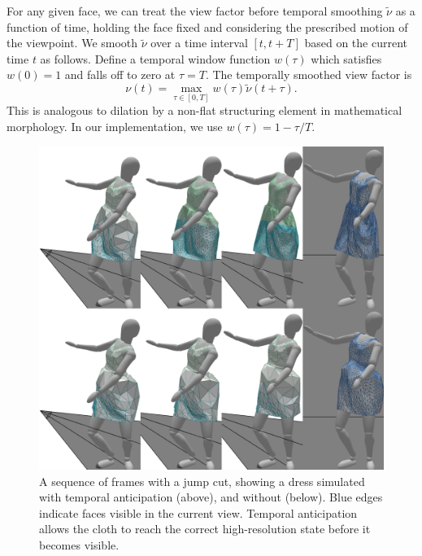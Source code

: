 \documentclass[10pt,journal,compsoc,twoside]{TexInputs/IEEEtran}
\begin{document}
For any given face, we can treat the view factor before temporal smoothing $\tilde\nu$ as a function of time, holding the face fixed and considering the prescribed motion of the viewpoint.
We smooth $\tilde\nu$ over a time interval $[t,t+T]$ based on the current time $t$ as follows.
Define a temporal window function $w(\tau)$ which satisfies $w(0) = 1$ and falls off to zero at $\tau = T$.
The temporally smoothed view factor is
\begin{equation}
    \nu(t) = \max_{\tau\in[0,T]} w(\tau)\tilde\nu(t+\tau).
\end{equation}
This is analogous to dilation by a non-flat structuring element in mathematical morphology.
In our implementation, we use $w(\tau) = 1 - \tau/T$.

\begin{figure}[t]
    \centering
    \includegraphics[width=1.0\columnwidth]{temporal_anticipation/temporal_anticipation}
    \caption{A sequence of frames with a jump cut, showing a dress simulated with temporal anticipation (above), and without (below). Blue edges indicate faces visible in the current view. Temporal anticipation allows the cloth to reach the correct high-resolution state before it becomes visible.}
    \label{fig:temporal_anticipation}
	\vspace*{-.03in}
\end{figure}
\end{document}
